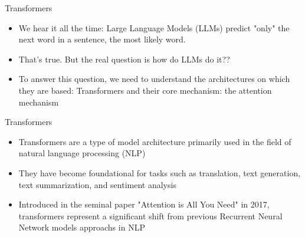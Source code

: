 \begin{frame}{Transformers}
  \begin{itemize}
      \item We hear it all the time: Large Language Models (LLMs) predict "only" the next word in a sentence, the most likely word.
      \item That's true. But the real question is how do LLMs do it??
      \item To answer this question, we need to understand the architectures on which they are based: Transformers and their core mechanism: the attention mechanism
  \end{itemize}
\end{frame}


\begin{frame}{Transformers}
    \begin{itemize}
        \item Transformers are a type of model architecture primarily used in the field of natural language processing (NLP)
        \item They have become foundational for tasks such as translation, text generation, text summarization, and sentiment analysis
        \item Introduced in the seminal paper "Attention is All You Need" in 2017, transformers represent a significant shift from previous Recurrent Neural Network models approachs in NLP
      \end{itemize}
\end{frame}

